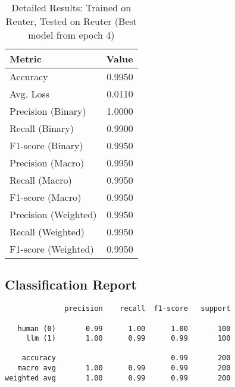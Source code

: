 \documentclass{article}
\begin{document}
\begin{table}[htbp]
\centering
\caption*{Detailed Results: Trained on Reuter, Tested on Reuter (Best model from epoch 4)}
\begin{tabular}{@{}lr@{}}
\toprule
Metric & Value \\
\midrule
Accuracy & 0.9950 \\
Avg. Loss & 0.0110 \\
Precision (Binary) & 1.0000 \\
Recall (Binary) & 0.9900 \\
F1-score (Binary) & 0.9950 \\
Precision (Macro) & 0.9950 \\
Recall (Macro) & 0.9950 \\
F1-score (Macro) & 0.9950 \\
Precision (Weighted) & 0.9950 \\
Recall (Weighted) & 0.9950 \\
F1-score (Weighted) & 0.9950 \\
\bottomrule
\end{tabular}
\subsection*{Classification Report}
\begin{verbatim}
              precision    recall  f1-score   support

   human (0)       0.99      1.00      1.00       100
     llm (1)       1.00      0.99      0.99       100

    accuracy                           0.99       200
   macro avg       1.00      0.99      0.99       200
weighted avg       1.00      0.99      0.99       200
\end{verbatim}
\end{table}
\end{document}
